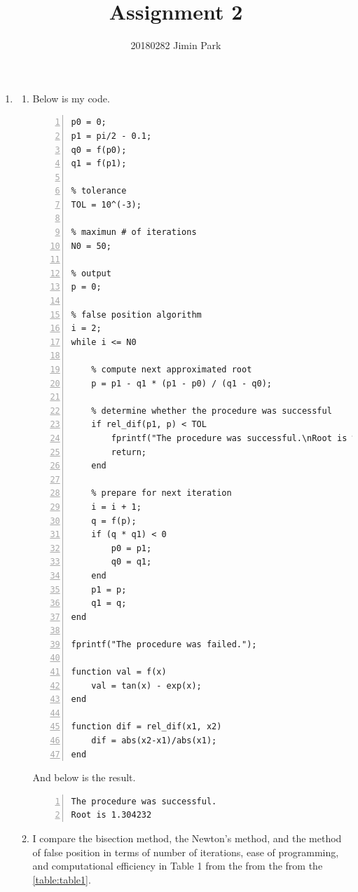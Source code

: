 \documentclass{article}
\begin{document}
\title{Assignment 2}
\author{20180282 Jimin Park}
\maketitle

\begin{enumerate}
    \item \begin{enumerate}[wide=10pt]
        \item Below is my code.
        \begin{lstlisting}[frame=single, numbers=left, style=Matlab-editor]
% initial approximations and function values
p0 = 0;
p1 = pi/2 - 0.1;
q0 = f(p0);
q1 = f(p1);

% tolerance
TOL = 10^(-3);

% maximun # of iterations
N0 = 50;

% output
p = 0;

% false position algorithm
i = 2;
while i <= N0

    % compute next approximated root
    p = p1 - q1 * (p1 - p0) / (q1 - q0);

    % determine whether the procedure was successful
    if rel_dif(p1, p) < TOL
        fprintf("The procedure was successful.\nRoot is %f\n", p);
        return;
    end

    % prepare for next iteration
    i = i + 1;
    q = f(p);
    if (q * q1) < 0
        p0 = p1;
        q0 = q1;
    end
    p1 = p;
    q1 = q;
end

fprintf("The procedure was failed.");

function val = f(x)
    val = tan(x) - exp(x);
end

function dif = rel_dif(x1, x2)
    dif = abs(x2-x1)/abs(x1);
end
        \end{lstlisting}
        And below is the result.

        \begin{lstlisting}[frame=single, numbers=left, style=Matlab-editor]
The procedure was successful.
Root is 1.304232
        \end{lstlisting}
        \item I compare the bisection method, the Newton's method, and the method of false position in terms of number of iterations, ease of programming, and computational efficiency in Table 1 from the from the from the \autoref{table:table1}.


\end{enumerate}
\end{enumerate}
\end{document}
